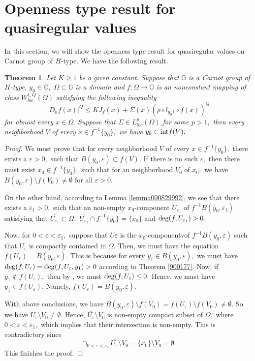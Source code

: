 \documentclass[11pt,twoside]{article}
\newtheorem{thm}{Theorem}[section]
\theoremstyle{definition}
\theoremstyle{remark}
\begin{document}
\section{Openness type result for quasiregular values}\label{sec7}
In this section, we will show the  openness type result for quasiregular values on Carnot group of $H$-type. We have the following result.
\begin{thm}
Let $K\geq1$ be a given constant. Suppose that $\mathbb{G}$ is a Carnot group of $H$-type,  $y_{0}\in\mathbb{G},$ $\Omega\subset\mathbb{G}$ is a domain and $f:\Omega\rightarrow \mathbb{G}$ is an nonconstant mapping of class $W_{loc}^{1,Q}(\Omega)$ satisfying  the following inequality
$$\vert D_{h}f(x)\vert^{Q}\leq KJ_{f}(x)+\Sigma(x)(\rho\circ l_{y_{0}^{-1}}\circ f(x))^{Q}$$
for almost every $x\in\Omega.$ Suppose that $\Sigma\in L_{loc}^{p}(\Omega)$ for some $p>1,$ then every neighborhood $V$ of every  $x\in f^{-1}\{y_{0}\},$ we have  $y_{0}\in{\rm int}f(V).$
\end{thm}
\begin{proof}
We must prove that for every neighborhood $V$ of every  $x\in f^{-1}\{y_{0}\},$ there exists a $\varepsilon>0,$ such that $B(y_{0},\varepsilon)\subset f(V).$ If there is no such $\varepsilon,$ then there must exist 
$x_{0}\in f^{-1}\{y_{0}\},$ such that for an neighborhood $V_{0}$ of $x_{0},$ we have $B(y_{0},\varepsilon)\setminus f(V_{0})\neq \emptyset$ for all $\varepsilon>0.$ 

On the other hand, according to Lemma \ref{lemma000829992}, we see that there exists a $\varepsilon_{1}>0,$ such that an non-empty $x_{0}$-component $U_{\varepsilon_{1}}$ of $f^{-1}B(y_{0},\varepsilon_{1})$ satisfying that $\overline{U_{\varepsilon_{1}}}\subset\Omega,$ $\overline{U_{\varepsilon_{1}}}\cap f^{-1}\{y_{0}\}=\{x_{0}\}$ and ${\rm deg}(f,U_{\varepsilon_{1}})>0.$ 

Now, for  $0<\varepsilon<\varepsilon_{1},$ suppose that $U\varepsilon$ is the $x_{0}$-componentvof $f^{-1}B(y_{0},\varepsilon)$ such that $U_{\varepsilon}$ is compactly contained in $\Omega.$ Then, we must have the equation
$f(U_{\varepsilon})=B(y_{0},\varepsilon).$ This is because for every $y_{1}\in B(y_{0},\varepsilon),$ we must have ${\rm deg}(f,U_{\varepsilon})={\rm deg}(f,U_{\varepsilon},y_{1})>0$ according to Theorem \ref{900177}.
Now, if $y_{1}\notin f(U_{\varepsilon}),$ then by \cite[Theorem 2.1]{FG95}, we must ${\rm deg}(f,U_{\varepsilon})\leq0.$ Hence, we must have $y_{1}\in f(U_{\varepsilon}).$ Namely, $f(U_{\varepsilon})=B(y_{0},\varepsilon).$

With above conclusions,  we have $B(y_{0},\varepsilon)\setminus f(V_{0})=f(U_{\varepsilon})\setminus f(V_{0})\neq \emptyset.$ So we have
$U_{\varepsilon}\setminus V_{0}\neq \emptyset.$ Hence, $\overline{U_{\varepsilon}}\setminus V_{0}$ is non-empty compact subset of $\Omega,$ where $0<\varepsilon<\varepsilon_{1},$ which implies that their
intersection is non-empty. This is contradictory since  $$\cap_{0<\varepsilon<\varepsilon_{1}}\overline{U_{\varepsilon}}\setminus V_{0}=\{x_{0}\}\setminus V_{0}= \emptyset.$$ This finishes the proof.
\end{proof}
\end{document}
